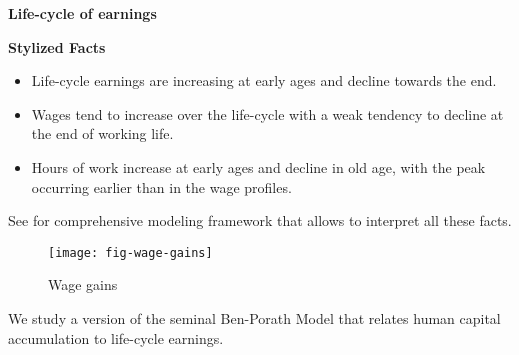 \begin{frame}\begin{center}
		\LARGE\textbf{Life-cycle of earnings}
\end{center}\end{frame}
\begin{frame}\textbf{Stylized Facts}\vspace{0.3cm}

\begin{itemize}\setlength\itemsep{1em}
\item Life-cycle earnings are increasing at early ages and decline towards the end.
\item Wages tend to increase over the life-cycle with a weak tendency to decline at the end of working life.
\item Hours of work increase at early ages and decline in old age, with the peak occurring earlier than in the wage profiles.
\end{itemize}

See  for comprehensive modeling framework that allows to interpret all these facts.
\end{frame}
\begin{frame}
	\begin{figure}[htp]\centering
		\caption{Wage gains}\scalebox{0.35}
		{\texttt{[image: fig-wage-gains]}}
	\end{figure}
\end{frame}
\begin{frame}
We study a version of the seminal Ben-Porath Model \cite{Ben-Porath.1967} that relates human capital accumulation to life-cycle earnings.
\end{frame}



